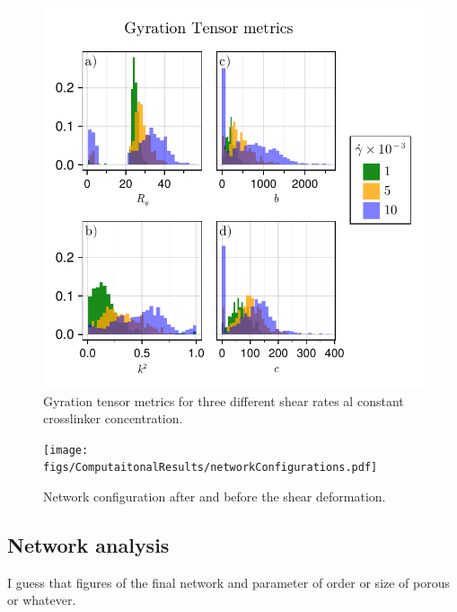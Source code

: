 \begin{figure}[ht!]
    \centering
    \includegraphics[width=\textwidth]{figs/ComputaitonalResults/metricsGyrationTensor.pdf}
    \caption{Gyration tensor metrics for three different shear rates al constant crosslinker concentration.}
\end{figure}


\begin{figure}[ht!]
    \centering
    \texttt{[image: figs/ComputaitonalResults/networkConfigurations.pdf]}
    \caption{Network configuration after and before the shear deformation.}
\end{figure}




\subsection{Network analysis}

I guess that figures of the final network and parameter of order or size of porous or whatever.

